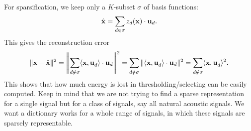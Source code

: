 \documentclass[../main.tex]{subfiles}
\begin{document}
For sparsification, we keep only a $K$-subset $\sigma$ of basis functions:
\begin{equation*}
\hat{\bf x}=\sum_{d\in \sigma}z_d({\bf x})\cdot {\bf u}_d.
\end{equation*}
This gives the reconstruction error
\begin{equation*}
\|{\bf x}-\hat{\bf x}\|^2=\left\|\sum_{d\notin \sigma}\langle {\bf x,u}_d\rangle \cdot {\bf u}_d \right\|^2 = \sum_{d\notin \sigma}\|\langle {\bf x,u}_d\rangle \cdot {\bf u}_d\|^2 = \sum_{d\notin \sigma}\langle {\bf x,u}_d\rangle^2.
\end{equation*}
This shows that how much energy is lost in thresholding/selecting can be easily computed. Keep in mind that we are not trying to find a sparse representation for a single signal but for a class of signals, say all natural acoustic signals. We want a dictionary works for a whole range of signals, in which these signals are sparsely representable. 
\end{document}
